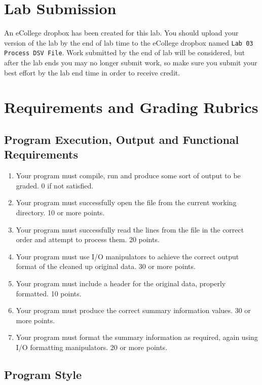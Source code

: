 \documentclass[11pt]{article}
\begin{document}
\section*{Lab Submission}
\label{sec-4}

An eCollege dropbox has been created for this lab.  You should
upload your version of the lab by the end of lab time to the eCollege
dropbox named \verb~Lab 03 Process DSV File~.  Work submitted by the end
of lab will be considered, but after the lab ends you may no longer
submit work, so make sure you submit your best effort by the lab end
time in order to receive credit.
\section*{Requirements and Grading Rubrics}
\label{sec-5}

\subsection*{Program Execution, Output and Functional Requirements}
\label{sec-5-1}

\begin{enumerate}
\item Your program must compile, run and produce some sort of output to be
graded. 0 if not satisfied.
\item Your program must successfully open the file from the current
working directory. 10 or more points.
\item Your program must successfully read the lines from the file in the
correct order and attempt to process them. 20 points.
\item Your program must use I/O manipulators to achieve the correct output
format of the cleaned up original data.  30 or more points.
\item Your program must include a header for the original data, properly
formatted. 10 points.
\item Your program must produce the correct summary information values. 30
or more points.
\item Your program must format the summary information as required, again
using I/O formatting manipulators.  20 or more points.
\end{enumerate}

\subsection*{Program Style}
\label{sec-5-2}
\end{document}
